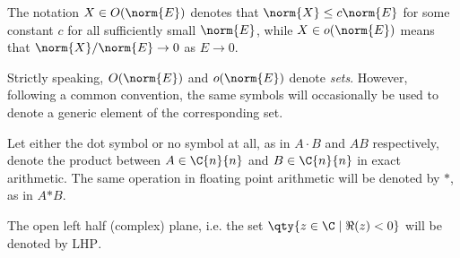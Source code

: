 \begin{notazione*}
	The notation $X\in O(\norm{E})$ denotes that $\norm{X}\le c\norm{E}$ for some constant $c$ for all sufficiently small $\norm{E}$, while $X\in o(\norm{E})$ means that $\norm{X}/\norm{E}\rightarrow 0$ as $E\to 0$.
	
	Strictly speaking, $O(\norm{E})$ and $o(\norm{E})$ denote \emph{sets}. However, following a common convention, the same symbols will occasionally be used to denote a generic element of the corresponding set.
\end{notazione*}
\smallskip 

\begin{notazione*}
	Let either the dot symbol or no symbol at all, as in $A\cdot B$ and $AB$ respectively, denote the product between $A\in\C{n}{n}$ and $B\in\C{n}{n}$ in exact arithmetic. The same operation in floating point arithmetic will be denoted by $\mathtt{*}$, as in $A\mathtt{*}B$.
\end{notazione*}
\smallskip

\begin{notazione*}
	The open left half (complex) plane, i.e. the set $\qty{z\in\C\mid\Re(z)<0}$ will be denoted by $\mathrm{LHP}$.
\end{notazione*}
\smallskip 

